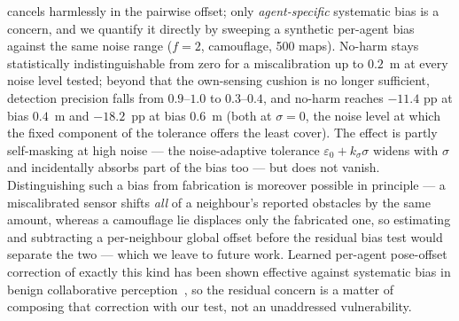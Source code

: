 cancels harmlessly in the pairwise offset; only \emph{agent-specific}
systematic bias is a concern, and we quantify it directly by sweeping a
synthetic per-agent bias against the same noise range ($f{=}2$, camouflage,
500 maps). No-harm stays statistically indistinguishable from zero for a
miscalibration up to $0.2$~m at every noise level tested; beyond that the
own-sensing cushion is no longer sufficient, detection precision falls from
$0.9$--$1.0$ to $0.3$--$0.4$, and no-harm reaches $-11.4$ pp at bias $0.4$~m
and $-18.2$~pp at bias $0.6$~m (both at $\sigma{=}0$, the noise level at
which the fixed component of the tolerance offers the least cover). The
effect is partly self-masking at high noise --- the noise-adaptive tolerance
$\varepsilon_0+k_\sigma\sigma$ widens with $\sigma$ and incidentally absorbs
part of the bias too --- but does not vanish. Distinguishing such a bias
from fabrication is moreover possible in principle --- a miscalibrated
sensor shifts \emph{all} of a neighbour's reported obstacles by the same
amount, whereas a camouflage lie displaces only the fabricated one, so
estimating and subtracting a per-neighbour global offset before the residual
bias test would separate the two --- which we leave to future work. Learned
per-agent pose-offset correction of exactly this kind has been shown effective
against systematic bias in benign collaborative
perception~\cite{vadivelu2020}, so the residual concern is a matter of
composing that correction with our test, not an unaddressed vulnerability.
